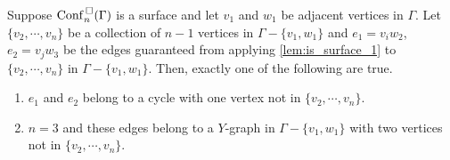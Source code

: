 \begin{lem}
    \label{lem:is_surface_2}
    Suppose \(\mathrm{Conf}^{\,\square}_n(\Gamma)\) is a surface and let \(v_1\) and \(w_1\) be adjacent vertices in \(\Gamma\).
    Let \(\{v_2, \cdots, v_n\}\) be a collection of \(n-1\) vertices in \(\Gamma - \{v_1, w_1\}\) 
    and \(e_1 = v_i w_2\), \(e_2 = v_j w_3\) be the edges guaranteed
    from applying \ref{lem:is_surface_1} to \(\{v_2, \cdots, v_n\}\) in \(\Gamma - \{v_1, w_1\}\).
    Then, exactly one of the following are true.
    \begin{enumerate}
        \item \(e_1\) and \(e_2\) belong to a cycle with one vertex not in \(\{v_2, \cdots, v_n\}\).
        \item \(n = 3\) and these edges belong to a \(Y\)-graph in \(\Gamma - \{v_1, w_1\}\) with two vertices not in \(\{v_2, \cdots, v_n\}\).
    \end{enumerate}
\end{lem}
